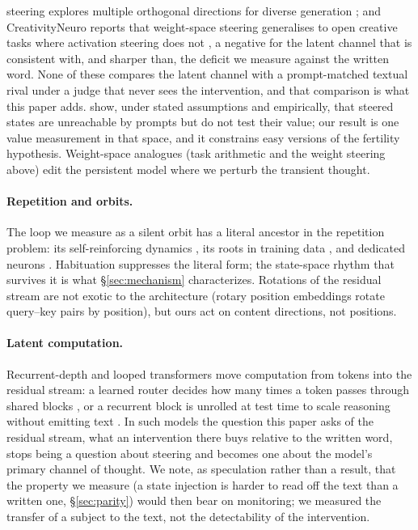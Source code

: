 \documentclass[11pt]{article}
\begin{document}
steering explores multiple orthogonal directions for diverse generation
\citep{zhu2026stars}; and CreativityNeuro reports that weight-space
steering generalises to open creative tasks where activation steering
does not \citep{schapiro2026creativityneuro}, a negative for the
latent channel that is consistent with, and sharper than, the deficit we
measure against the written word. None of these compares the latent
channel with a prompt-matched textual rival under a judge that never
sees the intervention, and that comparison is what this paper adds.
\citet{mishra2026nonsurjective} show, under stated assumptions and
empirically, that steered states are unreachable by prompts but do not
test their value; our result is one value measurement in that space,
and it constrains easy versions of the fertility hypothesis. Weight-space
analogues (task arithmetic \citep{ilharco2022task} and the weight
steering above) edit the persistent model where we perturb the
transient thought.

\paragraph{Repetition and orbits.} The loop we measure as a silent
orbit has a literal ancestor in the repetition problem: its
self-reinforcing dynamics \citep{xu2022learning}, its roots in
training data \citep{li2023repetition}, and dedicated neurons
\citep{hiraoka2025repetition}. Habituation suppresses the literal
form; the state-space rhythm that survives it is what \S\ref{sec:mechanism}
characterizes. Rotations of the residual stream are not exotic to the
architecture (rotary position embeddings \citep{su2024roformer}
rotate query--key pairs by position), but ours act on content
directions, not positions.

\paragraph{Latent computation.} Recurrent-depth and looped transformers
move computation from tokens into the residual stream: a learned router
decides how many times a token passes through shared blocks
\citep{bae2025mor}, or a recurrent block is unrolled at test time to
scale reasoning without emitting text \citep{geiping2025recurrent}. In
such models the question this paper asks of the residual stream,
what an intervention there buys relative to the written word, stops
being a question about steering and becomes one about the model's
primary channel of thought. We note, as speculation rather than a
result, that the property we measure (a state injection is harder
to read off the text than a written one, \S\ref{sec:parity}) would
then bear on monitoring; we measured the transfer of a subject to the
text, not the detectability of the intervention.
\end{document}
